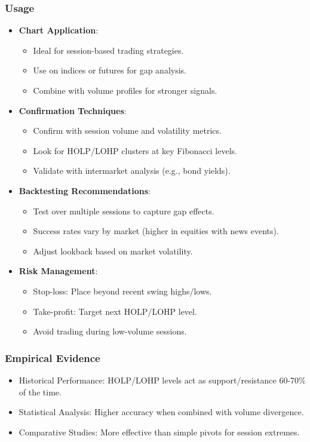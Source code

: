 \documentclass[12pt]{article}
\begin{document}
\subsubsection{Usage}
\begin{itemize}
\item \textbf{Chart Application}:
  \begin{itemize}
  \item Ideal for session-based trading strategies.
  \item Use on indices or futures for gap analysis.
  \item Combine with volume profiles for stronger signals.
  \end{itemize}
\item \textbf{Confirmation Techniques}:
  \begin{itemize}
  \item Confirm with session volume and volatility metrics.
  \item Look for HOLP/LOHP clusters at key Fibonacci levels.
  \item Validate with intermarket analysis (e.g., bond yields).
  \end{itemize}
\item \textbf{Backtesting Recommendations}:
  \begin{itemize}
  \item Test over multiple sessions to capture gap effects.
  \item Success rates vary by market (higher in equities with news events).
  \item Adjust lookback based on market volatility.
  \end{itemize}
\item \textbf{Risk Management}:
  \begin{itemize}
  \item Stop-loss: Place beyond recent swing highs/lows.
  \item Take-profit: Target next HOLP/LOHP level.
  \item Avoid trading during low-volume sessions.
  \end{itemize}
\end{itemize}

\subsubsection{Empirical Evidence}
\begin{itemize}
\item Historical Performance: HOLP/LOHP levels act as support/resistance 60-70\% of the time.
\item Statistical Analysis: Higher accuracy when combined with volume divergence.
\item Comparative Studies: More effective than simple pivots for session extremes.
\end{itemize}
\end{document}
